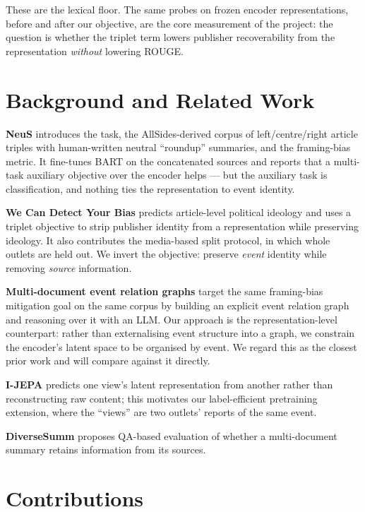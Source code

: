 \documentclass[10pt,twocolumn,a4paper]{article}
\begin{document}
These are the lexical floor. The same probes on frozen encoder representations,
before and after our objective, are the core measurement of the project: the
question is whether the triplet term lowers publisher recoverability from the
representation \emph{without} lowering ROUGE.

\section{Background and Related Work}

\textbf{NeuS} \cite{lee2022neus} introduces the task, the AllSides-derived
corpus of left/centre/right article triples with human-written neutral
``roundup'' summaries, and the framing-bias metric. It fine-tunes BART
\cite{lewis2020bart} on the concatenated sources and reports that a multi-task
auxiliary objective over the encoder helps --- but the auxiliary task is
classification, and nothing ties the representation to event identity.

\textbf{We Can Detect Your Bias} \cite{baly2020detect} predicts article-level
political ideology and uses a triplet objective to strip publisher identity from
a representation while preserving ideology. It also contributes the media-based
split protocol, in which whole outlets are held out. We invert the objective:
preserve \emph{event} identity while removing \emph{source} information.

\textbf{Multi-document event relation graphs} \cite{lei2024multidoc} target the
same framing-bias mitigation goal on the same corpus by building an explicit
event relation graph and reasoning over it with an LLM. Our approach is the
representation-level counterpart: rather than externalising event structure into
a graph, we constrain the encoder's latent space to be organised by event. We
regard this as the closest prior work and will compare against it directly.

\textbf{I-JEPA} \cite{assran2023ijepa} predicts one view's latent representation
from another rather than reconstructing raw content; this motivates our
label-efficient pretraining extension, where the ``views'' are two outlets'
reports of the same event.

\textbf{DiverseSumm} \cite{huang2024diversesumm} proposes QA-based evaluation of
whether a multi-document summary retains information from its sources.

\section{Contributions}
\end{document}

